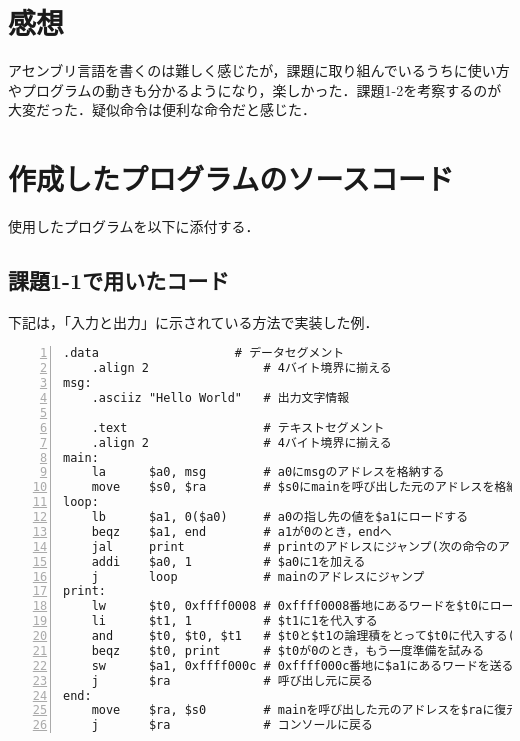 \section{感想}
アセンブリ言語を書くのは難しく感じたが，課題に取り組んでいるうちに使い方やプログラムの動きも分かるようになり，楽しかった．課題1-2を考察するのが大変だった．疑似命令は便利な命令だと感じた．

\section{作成したプログラムのソースコード} \label{sec:makep}

使用したプログラムを以下に添付する．



\subsection{課題1-1で用いたコード} \label{sec:p1-1}
下記は，「入力と出力」に示されている方法で実装した例．
\begin{Verbatim}[numbers=left, xleftmargin=10mm, numbersep=6pt,
                    fontsize=\small, baselinestretch=0.8]
    .data                   # データセグメント
    .align 2                # 4バイト境界に揃える
msg:
    .asciiz "Hello World"   # 出力文字情報

    .text                   # テキストセグメント
    .align 2                # 4バイト境界に揃える
main:
    la      $a0, msg        # a0にmsgのアドレスを格納する
    move    $s0, $ra        # $s0にmainを呼び出した元のアドレスを格納
loop:
    lb      $a1, 0($a0)     # a0の指し先の値を$a1にロードする
    beqz    $a1, end        # a1が0のとき，endへ
    jal     print           # printのアドレスにジャンプ(次の命令のアドレスを$raに)
    addi    $a0, 1          # $a0に1を加える
    j       loop            # mainのアドレスにジャンプ
print:
    lw      $t0, 0xffff0008 # 0xffff0008番地にあるワードを$t0にロードする
    li      $t1, 1          # $t1に1を代入する
    and     $t0, $t0, $t1   # $t0と$t1の論理積をとって$t0に代入する($t0が1か確認する)
    beqz    $t0, print      # $t0が0のとき，もう一度準備を試みる
    sw      $a1, 0xffff000c # 0xffff000c番地に$a1にあるワードを送る
    j       $ra             # 呼び出し元に戻る
end:
    move    $ra, $s0        # mainを呼び出した元のアドレスを$raに復元
    j       $ra             # コンソールに戻る
\end{Verbatim}

